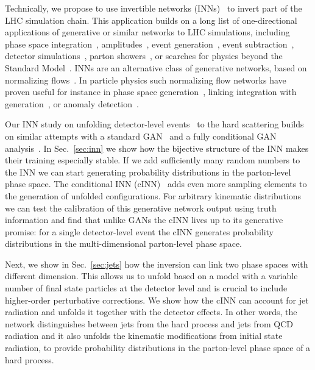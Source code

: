Technically, we propose to use invertible networks
(INNs)~\cite{inn1,coupling2,glow} to invert part of the LHC simulation
chain.  This application builds on a long list of one-directional
applications of generative or similar networks to LHC simulations,
including phase space integration~\cite{maxim,bendavid},
amplitudes~\cite{Bishara:2019iwh,Badger:2020uow}, event
generation~\cite{dutch,gan_datasets,DijetGAN2,gan_phasespace,Alanazi:2020klf},
event subtraction~\cite{subgan}, detector
simulations~\cite{calogan1,calogan2,fast_accurate,aachen_wgan1,aachen_wgan2,ATLASShowerGAN,ATLASsimGAN,Belayneh:2019vyx,Buhmann:2020pmy},
parton showers~\cite{shower,locationGAN,monkshower,juniprshower}, or
searches for physics beyond the Standard Model~\cite{bsm_gan}.  INNs
are an alternative class of generative networks, based on normalizing
flows~\cite{nflow1,papamakarios2019normalizing,nflow_review,mller2018neural}.
In particle physics such normalizing flow networks have proven useful
for instance in phase space generation~\cite{Bothmann:2020ywa},
linking integration with generation~\cite{Gao:2020vdv,Gao:2020zvv}, or
anomaly detection~\cite{Nachman:2020lpy}.

Our INN study on unfolding detector-level
events~\cite{Andreassen:2019cjw} to the hard scattering builds on
similar attempts with a standard GAN~\cite{Datta:2018mwd} and a fully
conditional GAN analysis~\cite{fcgan}.  In Sec.~\ref{sec:inn} we show
how the bijective structure of the INN makes their training especially
stable.  If we add sufficiently many random numbers to the INN we can
start generating probability distributions in the parton-level phase
space.  The conditional INN (cINN)~\cite{cinn,cinn2} adds even more
sampling elements to the generation of unfolded configurations.  For
arbitrary kinematic distributions we can test the calibration of this
generative network output using truth information and find that unlike
GANs the cINN lives up to its generative promise: for a single
detector-level event the cINN generates probability distributions in
the multi-dimensional parton-level phase space.

Next, we show in Sec.~\ref{sec:jets} how the inversion can link two
phase spaces with different dimension. This allows us to unfold based
on a model with a variable number of final state particles at the
detector level and is crucial to include higher-order perturbative
corrections. We show how the cINN can account for jet radiation and
unfolds it together with the detector effects.  In other words, the
network distinguishes between jets from the hard process and jets from
QCD radiation and it also unfolds the kinematic modifications from
initial state radiation, to provide probability distributions in the
parton-level phase space of a hard process.

